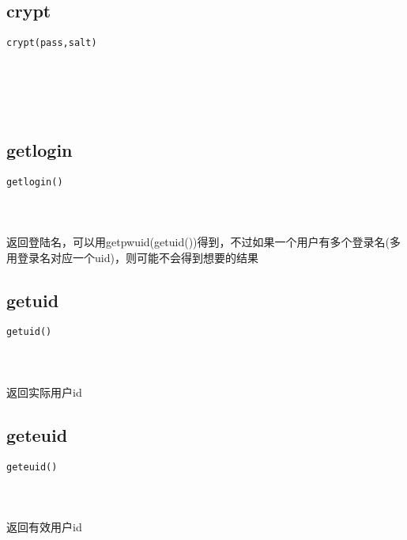 \documentclass[10pt,a4paper]{article}
\begin{document}
\subsection{crypt}
\begin{spacing}{2.0}
\lstset{language=C,numbers=none}
\begin{lstlisting}
crypt(pass,salt)
\end{lstlisting}
{\large\color[rgb]{0.2,0.4,0.6}{pass:}} \\
{\large\color[rgb]{0.2,0.4,0.6}{salt:}}
\paragraph{ \ \ }
\end{spacing}

\section{\color[rgb]{0.2,0.4,0.6}{进程用户信息}}
\subsection{getlogin}
\begin{spacing}{2.0}
\lstset{language=C,numbers=none}
\begin{lstlisting}
getlogin()
\end{lstlisting}
\paragraph{ \ \ }返回登陆名，可以用getpwuid(getuid())得到，不过如果一个用户有多个登录名(多用登录名对应一个uid)，则可能不会得到想要的结果
\end{spacing}

\subsection{getuid}
\begin{spacing}{2.0}
\lstset{language=C,numbers=none}
\begin{lstlisting}
getuid()
\end{lstlisting}
\paragraph{ \ \ }返回实际用户id
\end{spacing}

\subsection{geteuid}
\begin{spacing}{2.0}
\lstset{language=C,numbers=none}
\begin{lstlisting}
geteuid()
\end{lstlisting}
\paragraph{ \ \ }返回有效用户id
\end{spacing}
\end{document}
